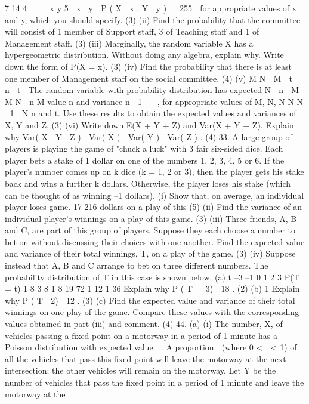 7 14
4



x y 5  x  y 
P ( X  x , Y  y ) 
 255 
for appropriate values of x and y, which you should specify.
(3)
(ii) Find the probability that the committee will consist of 1 member of Support
staff, 3 of Teaching staff and 1 of Management staff.
(3)
(iii) Marginally, the random variable X has a hypergeometric distribution. Without
doing any algebra, explain why. Write down the form of P(X = x).
(3)
(iv) Find the probability that there is at least one member of Management staff on
the social committee.
(4)
(v)
M N  M

t  n  t 
The random variable with probability distribution
has expected
N
 n 
M
M N  n
M
value n
and variance n  1  
, for appropriate values of M, N,
N
N N  1 
N
n and t. Use these results to obtain the expected values and variances of X, Y
and Z.
(3)
(vi)
Write down E(X + Y + Z) and Var(X + Y + Z). Explain why
Var( X  Y  Z )  Var( X )  Var( Y )  Var( Z ) .
(4)
33.
A large group of players is playing the game of "chuck a luck" with 3 fair six-sided
dice. Each player bets a stake of 1 dollar on one of the numbers 1, 2, 3, 4, 5 or 6. If
the player's number comes up on k dice (k = 1, 2 or 3), then the player gets his stake
back and wins a further k dollars. Otherwise, the player loses his stake (which can be
thought of as winning –1 dollars).
(i)
Show that, on average, an individual player loses
game.
17
216
dollars on a play of this
(5)
(ii)
Find the variance of an individual player's winnings on a play of this game.
(3)
(iii) Three friends, A, B and C, are part of this group of players. Suppose they each
choose a number to bet on without discussing their choices with one another.
Find the expected value and variance of their total winnings, T, on a play of the
game.
(3)
(iv) Suppose instead that A, B and C arrange to bet on three different numbers.
The probability distribution of T in this case is shown below.
(a)
t –3 –1 0 1 2 3
P(T = t) 1
8 3
8 1
8 19
72 1
12 1
36
Explain why P ( T   3)  18 .
(2)
(b)
1
Explain why P ( T  2)  12
.
(3)
(c)
Find the expected value and variance of their total winnings on one play
of the game. Compare these values with the corresponding values
obtained in part (iii) and comment.
(4)
44.
(a)
(i)
The number, X, of vehicles passing a fixed point on a motorway in a
period of 1 minute has a Poisson distribution with expected value  . A
proportion  (where 0 <  < 1) of all the vehicles that pass this fixed
point will leave the motorway at the next intersection; the other vehicles
will remain on the motorway. Let Y be the number of vehicles that pass
the fixed point in a period of 1 minute and leave the motorway at the
